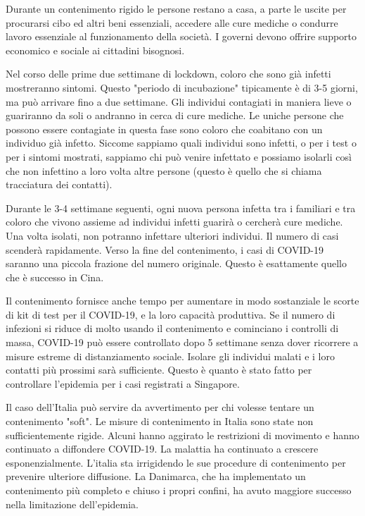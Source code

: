 \documentclass[onecolumn,journal]{IEEEtran}
\begin{document}
\begin{multicols}{2}

Durante un contenimento rigido le persone restano a casa, a parte le uscite per procurarsi cibo ed altri beni essenziali, accedere alle cure mediche o condurre lavoro essenziale al funzionamento della società. I governi devono offrire supporto economico e sociale ai cittadini bisognosi.

Nel corso delle prime due settimane di lockdown, coloro che sono già infetti mostreranno sintomi. Questo "periodo di incubazione" tipicamente è di 3-5 giorni, ma può arrivare fino a due settimane. Gli individui contagiati in maniera lieve o guariranno da soli o andranno in cerca di cure mediche. Le uniche persone che possono essere contagiate in questa fase sono coloro che coabitano con un individuo già infetto. Siccome sappiamo quali individui sono infetti, o per i test o per i sintomi mostrati, sappiamo chi può venire infettato e possiamo isolarli così che non infettino a loro volta altre persone (questo è quello che si chiama tracciatura dei contatti). 

Durante le 3-4 settimane seguenti, ogni nuova persona infetta tra i familiari e tra coloro che vivono assieme ad individui infetti guarirà o cercherà cure mediche. Una volta isolati, non potranno infettare ulteriori individui. Il numero di casi scenderà rapidamente. Verso la fine del contenimento, i casi di COVID-19 saranno una piccola frazione del numero originale. Questo è esattamente quello che è successo in Cina.

Il contenimento fornisce anche tempo per aumentare in modo sostanziale le scorte di kit di test per il COVID-19, e la loro capacità produttiva. Se il numero di infezioni si riduce di molto usando il contenimento e cominciano i controlli di massa, COVID-19 può essere controllato dopo 5 settimane senza dover ricorrere a misure estreme di distanziamento sociale. Isolare gli individui malati e i loro contatti più prossimi sarà sufficiente. Questo è quanto è stato fatto per controllare l'epidemia per i casi registrati a Singapore.

Il caso dell'Italia può servire da avvertimento per chi volesse tentare un contenimento "soft". Le misure di contenimento in Italia sono state non sufficientemente rigide. Alcuni hanno aggirato le restrizioni di movimento e hanno continuato a diffondere COVID-19. La malattia ha continuato a crescere esponenzialmente. L'italia sta irrigidendo le sue procedure di contenimento per prevenire ulteriore diffusione. La Danimarca, che ha implementato un contenimento più completo e chiuso i propri confini, ha avuto maggiore successo nella limitazione dell'epidemia.

\end{multicols}
\end{document}
